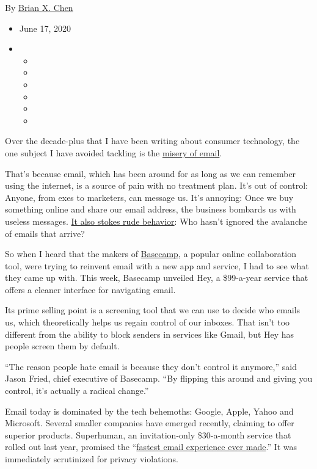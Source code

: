 By \href{https://www.nytimes3xbfgragh.onion/by/brian-x-chen}{Brian X.
Chen}

\begin{itemize}
\item
  June 17, 2020
\item
  \begin{itemize}
  \item
  \item
  \item
  \item
  \item
  \item
  \end{itemize}
\end{itemize}

Over the decade-plus that I have been writing about consumer technology,
the one subject I have avoided tackling is the
\href{https://bits.blogs.nytimes3xbfgragh.onion/2010/08/23/reinventing-e-mail-one-message-at-a-time/}{misery
of email}.

That's because email, which has been around for as long as we can
remember using the internet, is a source of pain with no treatment plan.
It's out of control: Anyone, from exes to marketers, can message us.
It's annoying: Once we buy something online and share our email address,
the business bombards us with useless messages.
\href{https://www.nytimes3xbfgragh.onion/2019/02/15/opinion/sunday/email-etiquette.html}{It
also stokes rude behavior}: Who hasn't ignored the avalanche of emails
that arrive?

So when I heard that the makers of
\href{https://basecamp.com/}{Basecamp}, a popular online collaboration
tool, were trying to reinvent email with a new app and service, I had to
see what they came up with. This week, Basecamp unveiled Hey, a
\$99-a-year service that offers a cleaner interface for navigating
email.

Its prime selling point is a screening tool that we can use to decide
who emails us, which theoretically helps us regain control of our
inboxes. That isn't too different from the ability to block senders in
services like Gmail, but Hey has people screen them by default.

``The reason people hate email is because they don't control it
anymore,'' said Jason Fried, chief executive of Basecamp. ``By flipping
this around and giving you control, it's actually a radical change.''

Email today is dominated by the tech behemoths: Google, Apple, Yahoo and
Microsoft. Several smaller companies have emerged recently, claiming to
offer superior products. Superhuman, an invitation-only \$30-a-month
service that rolled out last year, promised the
``\href{https://www.nytimes3xbfgragh.onion/2019/06/27/technology/superhuman-email.html}{fastest
email experience ever made}.'' It was immediately scrutinized for
privacy violations.

